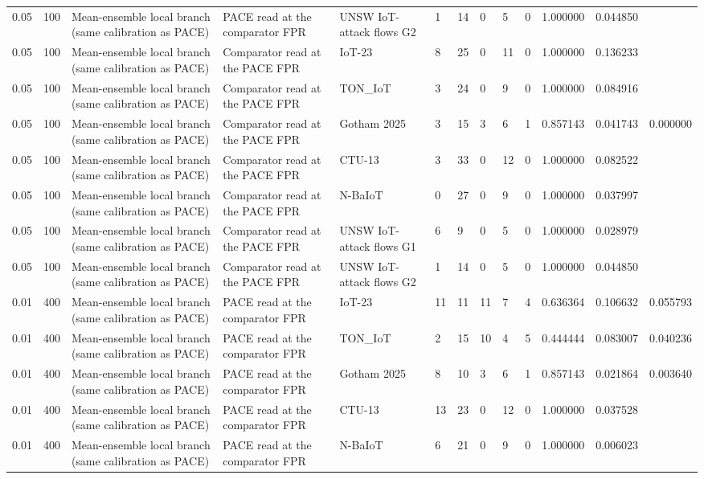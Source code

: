 \begin{tabular}{lllllllllllll}
0.05 & 100 & Mean-ensemble local branch (same calibration as PACE) & PACE read at the comparator FPR & UNSW IoT-attack flows G2 & 1 & 14 & 0 & 5 & 0 & 1.000000 & 0.044850 &  \\
0.05 & 100 & Mean-ensemble local branch (same calibration as PACE) & Comparator read at the PACE FPR & IoT-23 & 8 & 25 & 0 & 11 & 0 & 1.000000 & 0.136233 &  \\
0.05 & 100 & Mean-ensemble local branch (same calibration as PACE) & Comparator read at the PACE FPR & TON\_IoT & 3 & 24 & 0 & 9 & 0 & 1.000000 & 0.084916 &  \\
0.05 & 100 & Mean-ensemble local branch (same calibration as PACE) & Comparator read at the PACE FPR & Gotham 2025 & 3 & 15 & 3 & 6 & 1 & 0.857143 & 0.041743 & 0.000000 \\
0.05 & 100 & Mean-ensemble local branch (same calibration as PACE) & Comparator read at the PACE FPR & CTU-13 & 3 & 33 & 0 & 12 & 0 & 1.000000 & 0.082522 &  \\
0.05 & 100 & Mean-ensemble local branch (same calibration as PACE) & Comparator read at the PACE FPR & N-BaIoT & 0 & 27 & 0 & 9 & 0 & 1.000000 & 0.037997 &  \\
0.05 & 100 & Mean-ensemble local branch (same calibration as PACE) & Comparator read at the PACE FPR & UNSW IoT-attack flows G1 & 6 & 9 & 0 & 5 & 0 & 1.000000 & 0.028979 &  \\
0.05 & 100 & Mean-ensemble local branch (same calibration as PACE) & Comparator read at the PACE FPR & UNSW IoT-attack flows G2 & 1 & 14 & 0 & 5 & 0 & 1.000000 & 0.044850 &  \\
0.01 & 400 & Mean-ensemble local branch (same calibration as PACE) & PACE read at the comparator FPR & IoT-23 & 11 & 11 & 11 & 7 & 4 & 0.636364 & 0.106632 & 0.055793 \\
0.01 & 400 & Mean-ensemble local branch (same calibration as PACE) & PACE read at the comparator FPR & TON\_IoT & 2 & 15 & 10 & 4 & 5 & 0.444444 & 0.083007 & 0.040236 \\
0.01 & 400 & Mean-ensemble local branch (same calibration as PACE) & PACE read at the comparator FPR & Gotham 2025 & 8 & 10 & 3 & 6 & 1 & 0.857143 & 0.021864 & 0.003640 \\
0.01 & 400 & Mean-ensemble local branch (same calibration as PACE) & PACE read at the comparator FPR & CTU-13 & 13 & 23 & 0 & 12 & 0 & 1.000000 & 0.037528 &  \\
0.01 & 400 & Mean-ensemble local branch (same calibration as PACE) & PACE read at the comparator FPR & N-BaIoT & 6 & 21 & 0 & 9 & 0 & 1.000000 & 0.006023 &  \\

\end{tabular}
